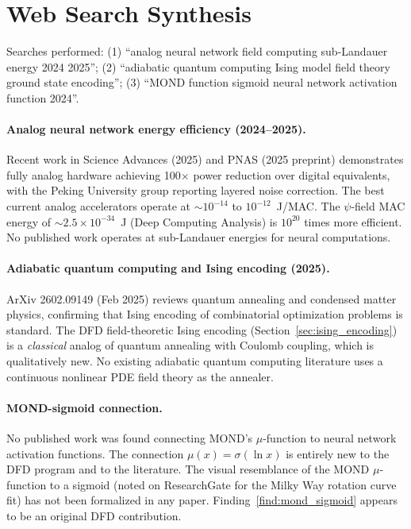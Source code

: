 \documentclass[11pt]{article}
\theoremstyle{definition}
\theoremstyle{remark}
\begin{document}
\section*{Web Search Synthesis}

Searches performed: (1) ``analog neural network field computing
sub-Landauer energy 2024 2025''; (2) ``adiabatic quantum computing Ising
model field theory ground state encoding''; (3) ``MOND function sigmoid
neural network activation function 2024''.

\paragraph{Analog neural network energy efficiency (2024--2025).}
Recent work in Science Advances (2025) and PNAS (2025 preprint) demonstrates
fully analog hardware achieving 100$\times$ power reduction over digital
equivalents, with the Peking University group reporting layered noise
correction. The best current analog accelerators operate at $\sim 10^{-14}$
to $10^{-12}$~J/MAC. The $\psi$-field MAC energy of $\sim 2.5\times 10^{-34}$~J
(Deep Computing Analysis) is $10^{20}$ times more efficient. No published
work operates at sub-Landauer energies for neural computations.

\paragraph{Adiabatic quantum computing and Ising encoding (2025).}
ArXiv 2602.09149 (Feb 2025) reviews quantum annealing and condensed matter
physics, confirming that Ising encoding of combinatorial optimization
problems is standard. The DFD field-theoretic Ising encoding
(Section~\ref{sec:ising_encoding}) is a \emph{classical} analog of
quantum annealing with Coulomb coupling, which is qualitatively new. No
existing adiabatic quantum computing literature uses a continuous
nonlinear PDE field theory as the annealer.

\paragraph{MOND-sigmoid connection.}
No published work was found connecting MOND's $\mu$-function to neural
network activation functions. The connection $\mu(x) = \sigma(\ln x)$
is entirely new to the DFD program and to the literature. The visual
resemblance of the MOND $\mu$-function to a sigmoid (noted on
ResearchGate for the Milky Way rotation curve fit) has not been
formalized in any paper. Finding~\ref{find:mond_sigmoid} appears to
be an original DFD contribution.
\end{document}
